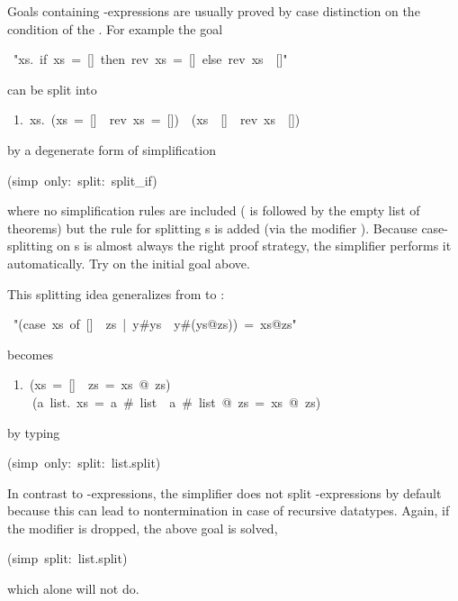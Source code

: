 \begin{isabelle}%
%
\begin{isamarkuptext}%
Goals containing -expressions are usually proved by case
distinction on the condition of the . For example the goal%
\end{isamarkuptext}%
~{"}{\isasymforall}xs.~if~xs~=~[]~then~rev~xs~=~[]~else~rev~xs~{\isasymnoteq}~[]{"}%
\begin{isamarkuptxt}%
\noindent
can be split into
\begin{isabellepar}%
~1.~{\isasymforall}xs.~(xs~=~[]~{\isasymlongrightarrow}~rev~xs~=~[])~{\isasymand}~(xs~{\isasymnoteq}~[]~{\isasymlongrightarrow}~rev~xs~{\isasymnoteq}~[])%
\end{isabellepar}%
by a degenerate form of simplification%
\end{isamarkuptxt}%
(simp~only:~split:~split\_if)%
\begin{isamarkuptext}%
\noindent
where no simplification rules are included ( is followed by the
empty list of theorems) but the rule  for
splitting s is added (via the modifier ). Because
case-splitting on s is almost always the right proof strategy, the
simplifier performs it automatically. Try 
on the initial goal above.

This splitting idea generalizes from  to :%
\end{isamarkuptext}%
~{"}(case~xs~of~[]~{\isasymRightarrow}~zs~|~y\#ys~{\isasymRightarrow}~y\#(ys@zs))~=~xs@zs{"}%
\begin{isamarkuptxt}%
\noindent
becomes
\begin{isabellepar}%
~1.~(xs~=~[]~{\isasymlongrightarrow}~zs~=~xs~@~zs)~{\isasymand}\isanewline
~~~~({\isasymforall}a~list.~xs~=~a~\#~list~{\isasymlongrightarrow}~a~\#~list~@~zs~=~xs~@~zs)%
\end{isabellepar}%
by typing%
\end{isamarkuptxt}%
(simp~only:~split:~list.split)%
\begin{isamarkuptext}%
\noindent
In contrast to -expressions, the simplifier does not split
-expressions by default because this can lead to nontermination
in case of recursive datatypes. Again, if the  modifier is
dropped, the above goal is solved,%
\end{isamarkuptext}%
(simp~split:~list.split)%
\begin{isamarkuptext}%
\noindent%
which  alone will not do.


\end{isamarkuptext}
\end{isabelle}
